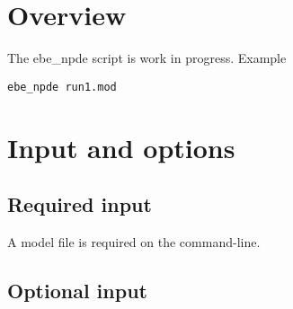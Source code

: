 


\maketitle


\section{Overview}

The ebe\_npde script is work in progress.
Example
\begin{verbatim}
ebe_npde run1.mod
\end{verbatim}

\section{Input and options}

\subsection{Required input}

A model file is required on the command-line.

\subsection{Optional input}

